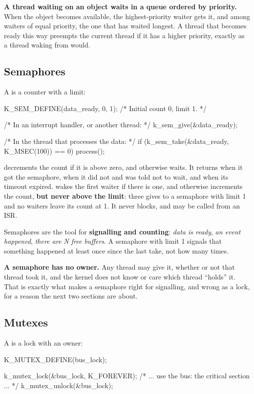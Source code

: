 \textbf{A thread waiting on an object waits in a queue ordered by priority.} When the object becomes
available, the highest-priority waiter gets it, and among waiters of equal priority, the one that
has waited longest. A thread that becomes ready this way preempts the current thread if it has a
higher priority, exactly as a thread waking from  would.

\subsection{Semaphores}
A  is a counter with a limit:

\begin{ccode}
K_SEM_DEFINE(data_ready, 0, 1);   /* Initial count 0, limit 1. */

/* In an interrupt handler, or another thread: */
k_sem_give(&data_ready);

/* In the thread that processes the data: */
if (k_sem_take(&data_ready, K_MSEC(100)) == 0) {
	process();
}
\end{ccode}

\noindent {} decrements the count if it is above zero, and otherwise waits. It
returns  when it got the semaphore,  when it did not and was told not to wait,
and  when its timeout expired.  wakes the first waiter if there is
one, and otherwise increments the count, \textbf{but never above the limit}: three gives to a
semaphore with limit 1 and no waiters leave its count at 1. It never blocks, and may be called from
an ISR.

Semaphores are the tool for \textbf{signalling and counting}: \emph{data is ready}, \emph{an event
happened}, \emph{there are N free buffers}. A semaphore with limit 1 signals that something happened
at least once since the last take, not how many times.

\textbf{A semaphore has no owner.} Any thread may give it, whether or not that thread took it, and
the kernel does not know or care which thread ``holds'' it. That is exactly what makes a semaphore
right for signalling, and wrong as a lock, for a reason the next two sections are about.

\subsection{Mutexes}
A  is a lock with an owner:

\begin{ccode}
K_MUTEX_DEFINE(bus_lock);

k_mutex_lock(&bus_lock, K_FOREVER);
/* ... use the bus: the critical section ... */
k_mutex_unlock(&bus_lock);
\end{ccode}

